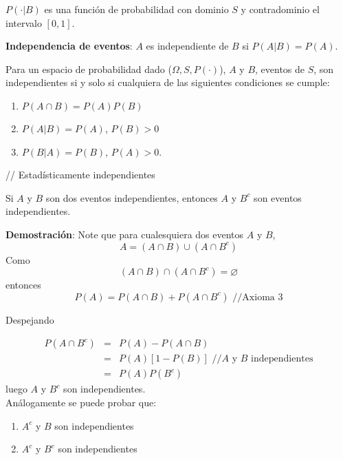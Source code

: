 \begin{remark}
$P(\cdot \left\vert B\right.)$ es una función de probabilidad con dominio $S$ y contradominio el intervalo $[0,1]$.    
\end{remark}

\textbf{Independencia de eventos}: $A$ es independiente de $B$ si $P(A\left\vert B\right.)=P(A)$.

\begin{definition}
Para un espacio de probabilidad dado ($\Omega ,S,P(\cdot)$), $A$ y $B$, eventos de $S$, son independientes si y solo si cualquiera de las siguientes condiciones se cumple:
\begin{enumerate}
\item $P(A\cap B)=P(A)P(B)$
\item  $P(A\left\vert B\right. )=P(A)$,  $P(B)>0$
\item  $P(B\left\vert A\right. )=P(B)$,  $P(A)>0$.
\end{enumerate}
\end{definition}

// Estadísticamente independientes

\begin{theorem}
Si $A$ y $B$ son dos eventos independientes, entonces $A$ y $B^{c}$ son eventos independientes.
\end{theorem}

\textbf{Demostración}: Note que para cualesquiera dos eventos $A$ y $B$,
\begin{equation*}
A=(A\cap B)\cup (A\cap B^{c})
\end{equation*}
Como 
\begin{equation*}
(A\cap B)\cap (A\cap B^{c})=\varnothing
\end{equation*}
entonces
\begin{equation*}
P(A)=P(A\cap B)+P(A\cap B^{c})\text{ //Axioma 3}
\end{equation*}

Despejando

\begin{eqnarray*}
P(A\cap B^{c}) &=&P(A)-P(A\cap B) \\
&=&P(A)[1-P(B)]\text{ //}A\text{ y }B\text{ independientes} \\
&=&P(A)P(B^{c})
\end{eqnarray*}
luego $A$ y $B^{c}$ son independientes.\\

Análogamente se puede probar que:
\begin{enumerate}
    \item $A^{c}$ y $B$ son independientes
    \item $A^{c}$ y $B^{c}$ son independientes
\end{enumerate}

